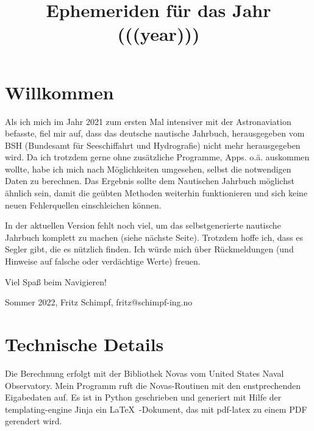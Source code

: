 \documentclass[a4paper, twoside]{book}
\title{Ephemeriden für das Jahr (((year)))}
\date{}
\begin{document}
\sffamily
\maketitle
\section{Willkommen}
Als ich mich im Jahr 2021 zum ersten Mal intensiver mit der Astronaviation befasste, fiel mir auf, dass das deutsche nautische Jahrbuch, herausgegeben vom BSH (Bundesamt für Seeschiffahrt und Hydrografie) nicht mehr herausgegeben wird. Da ich trotzdem gerne ohne zusätzliche Programme, Apps. o.ä. auskommen wollte, habe ich mich nach Möglichkeiten umgesehen, selbst die notwendigen Daten zu berechnen. Das Ergebnis sollte dem Nautischen Jahrbuch möglichst ähnlich sein, damit die geübten Methoden weiterhin funktionieren und sich keine neuen Fehlerquellen einschleichen können.

\vspace{1cm}
In der aktuellen Version fehlt noch viel, um das selbstgenerierte nautische Jahrbuch komplett zu machen (siehe nächste Seite). Trotzdem hoffe ich, dass es Segler gibt, die es nützlich finden. Ich würde mich über Rückmeldungen (und Hinweise auf falsche oder verdächtige Werte) freuen.

\vspace{1cm}
\begin{center}
Viel Spaß beim Navigieren!

\vspace{1cm}
Sommer 2022, Fritz Schimpf, fritz@schimpf-ing.no
\end{center} 

\vspace{1cm}



\section{Technische Details}
Die Berechnung erfolgt mit der Bibliothek Novas vom United States Naval Observatory. Mein Programm ruft die Novas-Routinen mit den enstprechenden Eigabedaten auf. Es ist in Python geschrieben und generiert mit Hilfe der templating-engine Jinja ein \LaTeX\ -Dokument, das mit pdf-latex zu einem PDF gerendert wird.

\newpage
\end{document}
